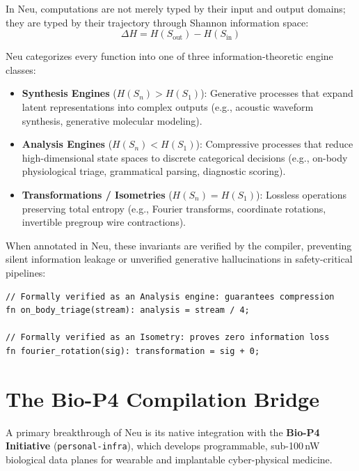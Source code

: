 \documentclass[11pt]{article}
\begin{document}
In Neu, computations are not merely typed by their input and output domains; they are typed by their trajectory through Shannon information space:
\begin{equation}
    \Delta H = H(S_{\text{out}}) - H(S_{\text{in}})
\end{equation}

Neu categorizes every function into one of three information-theoretic engine classes:
\begin{itemize}
    \item \textbf{Synthesis Engines} ($H(S_n) > H(S_1)$): Generative processes that expand latent representations into complex outputs (e.g., acoustic waveform synthesis, generative molecular modeling).
    \item \textbf{Analysis Engines} ($H(S_n) < H(S_1)$): Compressive processes that reduce high-dimensional state spaces to discrete categorical decisions (e.g., on-body physiological triage, grammatical parsing, diagnostic scoring).
    \item \textbf{Transformations / Isometries} ($H(S_n) = H(S_1)$): Lossless operations preserving total entropy (e.g., Fourier transforms, coordinate rotations, invertible pregroup wire contractions).
\end{itemize}

When annotated in Neu, these invariants are verified by the compiler, preventing silent information leakage or unverified generative hallucinations in safety-critical pipelines:
\begin{lstlisting}[language=neu]
// Formally verified as an Analysis engine: guarantees compression
fn on_body_triage(stream): analysis = stream / 4;

// Formally verified as an Isometry: proves zero information loss
fn fourier_rotation(sig): transformation = sig + 0;
\end{lstlisting}

\section{The Bio-P4 Compilation Bridge}

A primary breakthrough of Neu is its native integration with the \textbf{Bio-P4 Initiative} (\texttt{personal-infra}), which develops programmable, sub-100\,nW biological data planes for wearable and implantable cyber-physical medicine.
\end{document}
